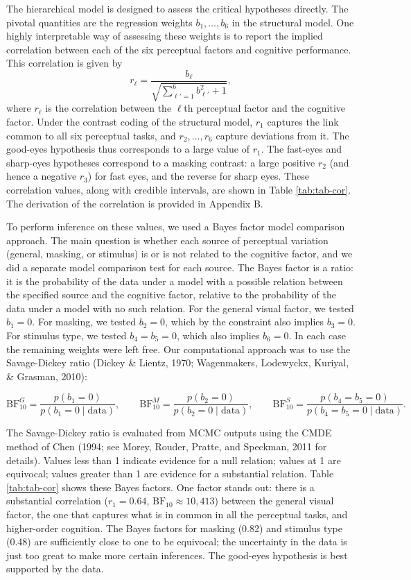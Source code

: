 \documentclass[
  ,man]{apa6}
\begin{document}
The hierarchical model is designed to assess the critical hypotheses directly. The pivotal quantities are the regression weights \(b_1, \ldots, b_6\) in the structural model. One highly interpretable way of assessing these weights is to report the implied correlation between each of the six perceptual factors and cognitive performance. This correlation is given by \[
r_\ell = \frac{b_\ell}{\sqrt{\sum_{\ell'=1}^{6} b_{\ell'}^2 + 1}},\] where \(r_\ell\) is the correlation between the \(\ell\)th perceptual factor and the cognitive factor. Under the contrast coding of the structural model, \(r_1\) captures the link common to all six perceptual tasks, and \(r_2, \ldots, r_6\) capture deviations from it. The good-eyes hypothesis thus corresponds to a large value of \(r_1\). The fast-eyes and sharp-eyes hypotheses correspond to a masking contrast: a large positive \(r_2\) (and hence a negative \(r_3\)) for fast eyes, and the reverse for sharp eyes. These correlation values, along with credible intervals, are shown in Table \ref{tab:tab-cor}. The derivation of the correlation is provided in Appendix B.

To perform inference on these values, we used a Bayes factor model comparison approach. The main question is whether each source of perceptual variation (general, masking, or stimulus) is or is not related to the cognitive factor, and we did a separate model comparison test for each source. The Bayes factor is a ratio: it is the probability of the data under a model with a possible relation between the specified source and the cognitive factor, relative to the probability of the data under a model with no such relation. For the general visual factor, we tested \(b_1 = 0\). For masking, we tested \(b_2 = 0\), which by the constraint also implies \(b_3 = 0\). For stimulus type, we tested \(b_4 = b_5 = 0\), which also implies \(b_6 = 0\). In each case the remaining weights were left free. Our computational approach was to use the Savage-Dickey ratio (Dickey \& Lientz, 1970; Wagenmakers, Lodewyckx, Kuriyal, \& Grasman, 2010):

\[
\text{BF}_{10}^{G} = \frac{p(b_1 = 0)}{p(b_1 = 0 \mid \text{data})}, \qquad
\text{BF}_{10}^{M} = \frac{p(b_2 = 0)}{p(b_2 = 0 \mid \text{data})}, \qquad
\text{BF}_{10}^{S} = \frac{p(b_4 = b_5 = 0)}{p(b_4 = b_5 = 0 \mid \text{data})}.
\]

The Savage-Dickey ratio is evaluated from MCMC outputs using the CMDE method of Chen (1994; see Morey, Rouder, Pratte, and Speckman, 2011 for details). Values less than 1 indicate evidence for a null relation; values at 1 are equivocal; values greater than 1 are evidence for a substantial relation. Table \ref{tab:tab-cor} shows these Bayes factors. One factor stands out: there is a substantial correlation (\(r_1 = 0.64\), \(\text{BF}_{10} \approx 10{,}413\)) between the general visual factor, the one that captures what is in common in all the perceptual tasks, and higher-order cognition. The Bayes factors for masking (0.82) and stimulus type (0.48) are sufficiently close to one to be equivocal; the uncertainty in the data is just too great to make more certain inferences. The good-eyes hypothesis is best supported by the data.
\end{document}

